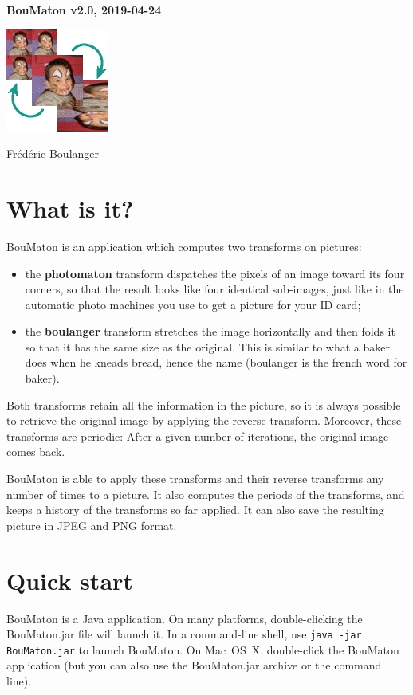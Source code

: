 \documentclass[a4paper]{article}
\newcommand{\bouVersion}{2.0\xspace}
\newcommand{\bouRelease}{2019-04-24\xspace}
\newcommand{\BouMaton}{\textsf{BouMaton}\xspace}
\newcommand{\filename}[1]{\textsf{#1}}
\begin{document}
  \begin{center}
    \textsf{\textbf{\large BouMaton v\bouVersion, \bouRelease}}
    
    \includegraphics[scale=0.5]{icone}
    
    \href{mailto:Frederic.Boulanger@centralesupelec.fr}{\textsf{Frédéric Boulanger}}
  \end{center}
  
  
  \section{What is it?}
  \BouMaton is an application which computes two transforms on pictures:
  \begin{itemize}
    \item the \textbf{photomaton} transform dispatches the pixels of an 
    image toward its four corners, so that the result looks like four 
    identical sub-images, just like in the automatic photo machines you 
    use to get a picture for your ID card;
    
    \item the \textbf{boulanger} transform stretches the image 
    horizontally and then folds it so that it has the same size as the 
    original. This is similar to what a baker does when he kneads 
    bread, hence the name (boulanger is the french word for baker).
  \end{itemize}
  
  Both transforms retain all the information in the picture, so it is 
  always possible to retrieve the original image by applying the 
  reverse transform. Moreover, these transforms are periodic: After a 
  given number of iterations, the original image comes back.
  
  \BouMaton is able to apply these transforms and their reverse 
  transforms any number of times to a picture. It also computes the 
  periods of the transforms, and keeps a history of the transforms 
  so far applied. It can also save the resulting picture in JPEG and PNG format.
  
  \section{Quick start}
  \BouMaton is a Java application. On many platforms, double-clicking 
  the \filename{BouMaton.jar} file will launch it. In a command-line 
  shell, use \verb|java -jar BouMaton.jar| to launch \BouMaton. On 
  Mac~OS~X, double-click the \filename{BouMaton} application (but you 
  can also use the \filename{BouMaton.jar} archive or the command line).
  
\end{document}
